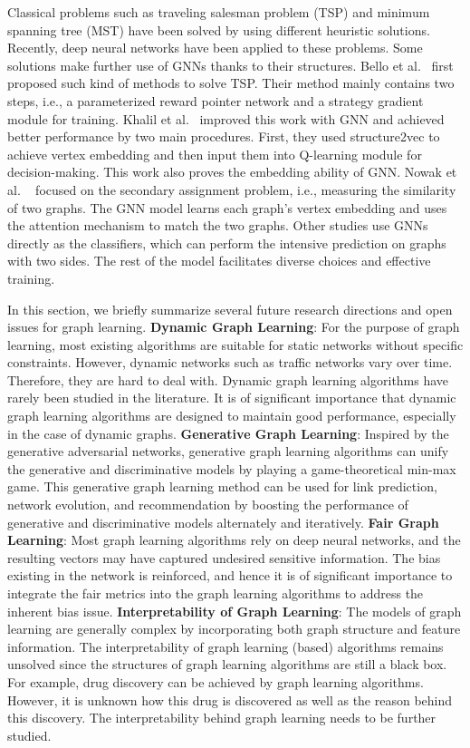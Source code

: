 Classical problems such as traveling salesman problem (TSP) and minimum spanning tree (MST) have been solved by using different heuristic solutions. Recently, deep neural networks have been applied to these problems. Some solutions make further use of GNNs thanks to their structures. Bello et al.~ first proposed such kind of methods to solve TSP. Their method mainly contains two steps, i.e., a parameterized reward pointer network and a strategy gradient module for training. Khalil et al.~ improved this work with GNN and achieved better performance by two main procedures. First, they used structure2vec to achieve vertex embedding and then input them into Q-learning module for decision-making. This work also proves the embedding ability of GNN. Nowak et al. ~ focused on the secondary assignment problem, i.e., measuring the similarity of two graphs. The GNN model learns each graph's vertex embedding and uses the attention mechanism to match the two graphs. Other studies use GNNs directly as the classifiers, which can perform the intensive prediction on graphs with two sides. The rest of the model facilitates diverse choices and effective training.

\label{sec:issues}
In this section, we briefly summarize several future research directions and open issues for graph learning.
\textbf{Dynamic Graph Learning}: For the purpose of graph learning, most existing algorithms are suitable for static networks without specific constraints. However, dynamic networks such as traffic networks vary over time. Therefore, they are hard to deal with. Dynamic graph learning algorithms have rarely been studied in the literature. It is of significant importance that dynamic graph learning algorithms are designed to maintain good performance, especially in the case of dynamic graphs.
\textbf{Generative Graph Learning}: Inspired by the generative adversarial networks, generative graph learning algorithms can unify the generative and discriminative models by playing a game-theoretical min-max game. This generative graph learning method can be used for link prediction, network evolution, and recommendation by boosting the performance of generative and discriminative models alternately and iteratively.
\textbf{Fair Graph Learning}: Most graph learning algorithms rely on deep neural networks, and the resulting vectors may have captured undesired sensitive information. The bias existing in the network is reinforced, and hence it is of significant importance to integrate the fair metrics into the graph learning algorithms to address the inherent bias issue.
\textbf{Interpretability of Graph Learning}: The models of graph learning are generally complex by incorporating both graph structure and feature information. The interpretability of graph learning (based) algorithms remains unsolved since the structures of graph learning algorithms are still a black box. For example, drug discovery can be achieved by graph learning algorithms. However, it is unknown how this drug is discovered as well as the reason behind this discovery. The interpretability behind graph learning needs to be further studied.

